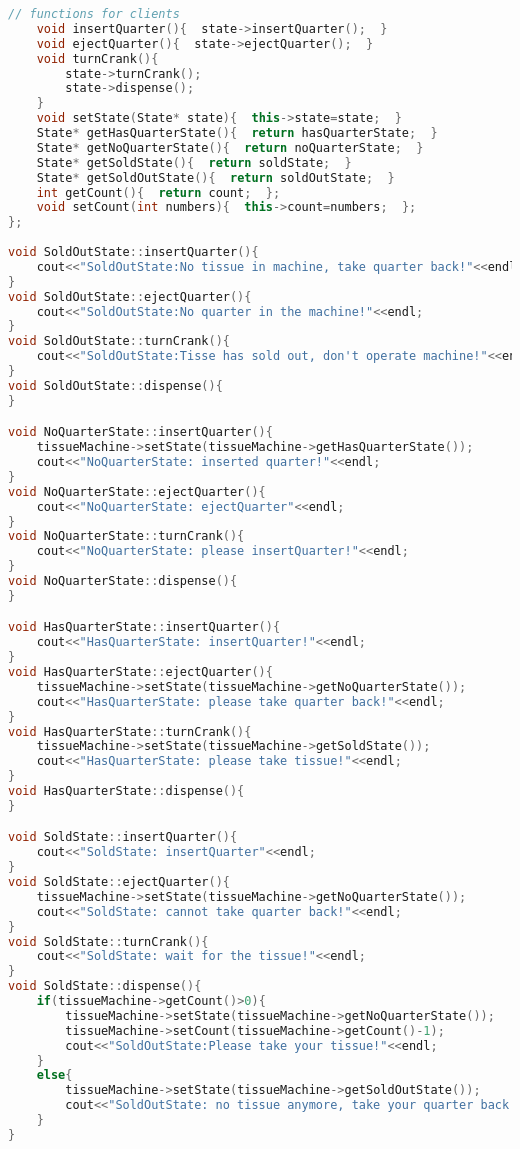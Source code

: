 \documentclass{book}
\begin{document}
\begin{lstlisting}[caption={State Pattern exmaple 3: vending (tissue only) meachine}, language=C++]
    // functions for clients
    void insertQuarter(){  state->insertQuarter();  }  
    void ejectQuarter(){  state->ejectQuarter();  }  
    void turnCrank(){  
        state->turnCrank();  
        state->dispense();  
    }  
    void setState(State* state){  this->state=state;  }  
    State* getHasQuarterState(){  return hasQuarterState;  }  
    State* getNoQuarterState(){  return noQuarterState;  }  
    State* getSoldState(){  return soldState;  }     
    State* getSoldOutState(){  return soldOutState;  }  
    int getCount(){  return count;  };  
    void setCount(int numbers){  this->count=numbers;  };  
};  
  
void SoldOutState::insertQuarter(){       
    cout<<"SoldOutState:No tissue in machine, take quarter back!"<<endl;  
}  
void SoldOutState::ejectQuarter(){  
    cout<<"SoldOutState:No quarter in the machine!"<<endl;  
}  
void SoldOutState::turnCrank(){  
    cout<<"SoldOutState:Tisse has sold out, don't operate machine!"<<endl;  
}  
void SoldOutState::dispense(){  
}  

void NoQuarterState::insertQuarter(){         
    tissueMachine->setState(tissueMachine->getHasQuarterState());  
    cout<<"NoQuarterState: inserted quarter!"<<endl;  
}  
void NoQuarterState::ejectQuarter(){  
    cout<<"NoQuarterState: ejectQuarter"<<endl;  
}  
void NoQuarterState::turnCrank(){  
    cout<<"NoQuarterState: please insertQuarter!"<<endl;  
}  
void NoQuarterState::dispense(){  
}  

void HasQuarterState::insertQuarter(){  
    cout<<"HasQuarterState: insertQuarter!"<<endl;  
}  
void HasQuarterState::ejectQuarter(){  
    tissueMachine->setState(tissueMachine->getNoQuarterState());  
    cout<<"HasQuarterState: please take quarter back!"<<endl;  
}  
void HasQuarterState::turnCrank(){  
    tissueMachine->setState(tissueMachine->getSoldState());  
    cout<<"HasQuarterState: please take tissue!"<<endl;  
}  
void HasQuarterState::dispense(){  
}  

void SoldState::insertQuarter(){  
    cout<<"SoldState: insertQuarter"<<endl;  
}  
void SoldState::ejectQuarter(){  
    tissueMachine->setState(tissueMachine->getNoQuarterState());  
    cout<<"SoldState: cannot take quarter back!"<<endl;  
}  
void SoldState::turnCrank(){  
    cout<<"SoldState: wait for the tissue!"<<endl;  
}  
void SoldState::dispense(){
    if(tissueMachine->getCount()>0){  
        tissueMachine->setState(tissueMachine->getNoQuarterState());  
        tissueMachine->setCount(tissueMachine->getCount()-1);  
        cout<<"SoldOutState:Please take your tissue!"<<endl;  
    }  
    else{  
        tissueMachine->setState(tissueMachine->getSoldOutState());  
        cout<<"SoldOutState: no tissue anymore, take your quarter back!"<<endl;  
    }  
}     


\end{lstlisting}
\end{document}

